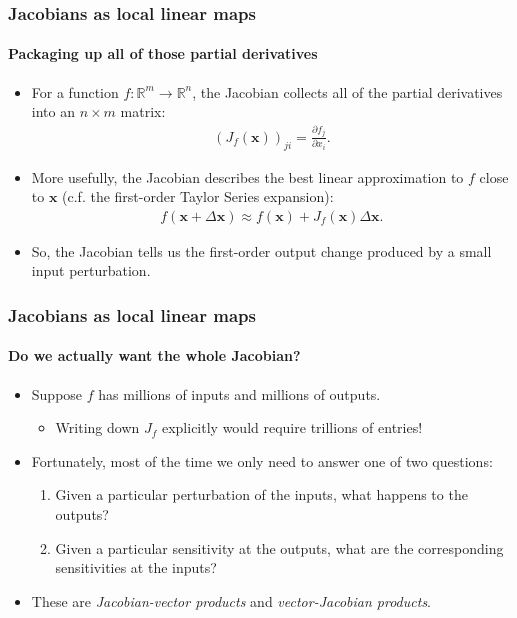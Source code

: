 \documentclass[]{article}
\begin{document}
\begin{frame}
\frametitle{Jacobians as local linear maps}
\framesubtitle{Packaging up all of those partial derivatives}
\begin{itemize}
	\item<+-> For a function $f:\mathbb{R}^m\rightarrow\mathbb{R}^n$, the Jacobian collects all of the partial derivatives into an $n\times m$ matrix:
	\begin{align*}
		(J_f(\bm x))_{ji}=\frac{\partial f_j}{\partial x_i}.
	\end{align*}
	\item<+-> More usefully, the Jacobian describes the best linear approximation to $f$ close to $\bm x$ (c.f. the first-order Taylor Series expansion):
	\begin{align*}
		f(\bm x+\Delta\bm x)\approx f(\bm x)+J_f(\bm x)\Delta\bm x.
	\end{align*}
	\item<+-> So, the Jacobian tells us the first-order output change produced by a small input perturbation.
\end{itemize}
\end{frame}


\begin{frame}
\frametitle{Jacobians as local linear maps}
\framesubtitle{Do we actually want the whole Jacobian?}
\begin{itemize}
	\item<+-> Suppose $f$ has millions of inputs and millions of outputs.
	\begin{itemize}
		\item Writing down $J_f$ explicitly would require trillions of entries!
	\end{itemize}
	\item<+-> Fortunately, most of the time we only need to answer one of two questions:
	\begin{enumerate}
		\item Given a particular perturbation of the inputs, what happens to the outputs?
		\item Given a particular sensitivity at the outputs, what are the corresponding sensitivities at the inputs?
	\end{enumerate}
	\item<+-> These are \emph{Jacobian-vector products} and \emph{vector-Jacobian products}.
\end{itemize}
\end{frame}
\end{document}
